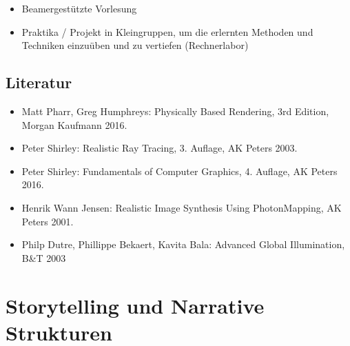 \begin{itemize}
\tightlist
\item
  Beamergestützte Vorlesung
\item
  Praktika / Projekt in Kleingruppen, um die erlernten Methoden und
  Techniken einzuüben und zu vertiefen (Rechnerlabor)
\end{itemize}

\section*{Literatur\label{/mi-2017/modulbeschreibungen-master/MA_VC_Modul_PhotorealistischeBildsynthese}}\label{literaturpathlabelmi-2017modulbeschreibungen-mastermaux5fvcux5fmodulux5fphotorealistischebildsynthese}

\begin{itemize}
\tightlist
\item
  Matt Pharr, Greg Humphreys: Physically Based Rendering, 3rd Edition,
  Morgan Kaufmann 2016.
\item
  Peter Shirley: Realistic Ray Tracing, 3. Auflage, AK Peters 2003.
\item
  Peter Shirley: Fundamentals of Computer Graphics, 4. Auflage, AK
  Peters 2016.
\item
  Henrik Wann Jensen: Realistic Image Synthesis Using PhotonMapping, AK
  Peters 2001.
\item
  Philp Dutre, Phillippe Bekaert, Kavita Bala: Advanced Global
  Illumination, B\&T 2003
\end{itemize}

\chapter{Storytelling und Narrative
Strukturen\label{/mi-2017/modulbeschreibungen-master/MA_VC_Modul_Storytelling}}\label{storytelling-und-narrative-strukturenpathlabelmi-2017modulbeschreibungen-mastermaux5fvcux5fmodulux5fstorytelling}

